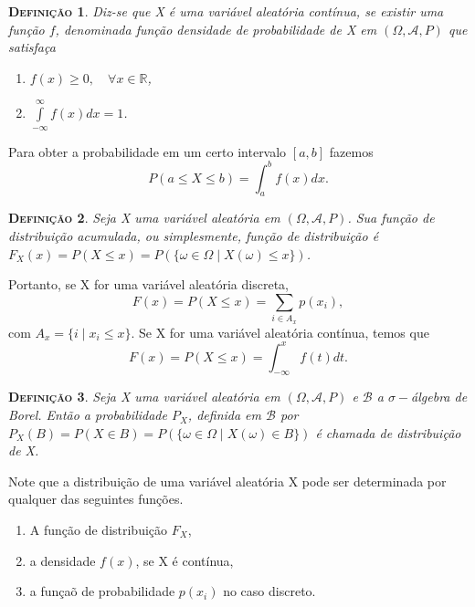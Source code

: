 \documentclass[
	12pt,				%
    oneside,			%
	a4paper,			%
	english,			%
	french,				%
	spanish,			%
	brazil,				%
	]{abntex2}
\newtheorem{definicao}{\scshape Defini\c{c}\~ao}[section]
\begin{document}
        \begin{definicao}
            Diz-se que X é uma variável aleatória contínua, se existir uma função $f$, denominada função densidade de probabilidade de X em $\left(\Omega, \mathcal{A}, P\right)$ que satisfaça
            \begin{enumerate}
                \item $f(x) \geq 0,\quad \forall x \in\mathbb{R}$,
                \item $\int\limits_{-\infty}^{\infty}f(x)dx = 1$.
            \end{enumerate}
        \end{definicao}
        Para obter a probabilidade em um certo intervalo $[a,b]$ fazemos
        \begin{equation*}
            P(a\leq X \leq b) = \int_{a}^{b}f(x)dx.
        \end{equation*}

        \begin{definicao}
            Seja X uma variável aleatória em $\left(\Omega, \mathcal{A}, P\right)$. Sua função de distribuição acumulada, ou simplesmente, função de distribuição é $F_X(x) = P(X \leq x) = P(\{\omega \in \Omega \mid X(\omega) \leq x\})$.
        \end{definicao}
        Portanto, se X for uma variável aleatória discreta,
        \begin{equation*}
            F(x) = P(X\leq x) = \sum_{i\in A_x} p(x_i),
        \end{equation*}
        com $A_x = \{i \mid x_i \leq x\}$. Se X for uma variável aleatória contínua, temos que
        \begin{equation*}
            F(x) = P(X\leq x) = \int_{-\infty}^{x}f(t)dt.
        \end{equation*}

        \begin{definicao}
            Seja X uma variável aleatória em $\left(\Omega, \mathcal{A}, P\right)$ e $\mathcal{B}$ a $\sigma-$álgebra de Borel. Então a probabilidade $P_X$, definida em $\mathcal{B}$ por $P_X(B) = P(X\in B) = P(\{\omega \in \Omega \mid X(\omega) \in B\})$ é chamada de distribuição de X.
        \end{definicao}

        Note que a distribuição de uma variável aleatória X pode ser determinada por qualquer das seguintes funções.
        \begin{enumerate}[label=(\arabic*)]
            \item A função de distribuição $F_X$,
            \item a densidade $f(x)$, se X é contínua,
            \item a funçaõ de probabilidade $p(x_i)$ no caso discreto.
        \end{enumerate}
\end{document}
